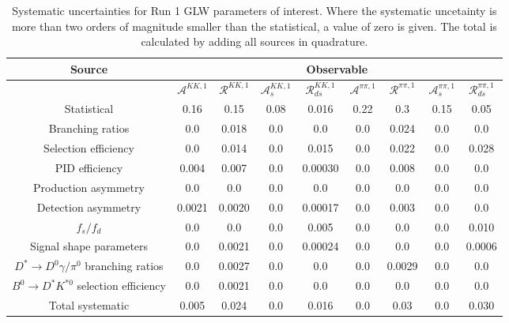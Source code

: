 \begin{sidewaystable}
  \centering
  \begin{tabular}{ccccccccc}
      \toprule
      Source & \multicolumn{8}{c}{Observable} \\
      \midrule
       & $\mathcal{A}^{KK,1}$ & $\mathcal{R}^{KK,1}$ & $\mathcal{A}_s^{KK,1}$ & $\mathcal{R}_{ds}^{KK,1}$ & $\mathcal{A}^{\pi\pi,1}$ & $\mathcal{R}^{\pi\pi,1}$ & $\mathcal{A}_s^{\pi\pi,1}$ & $\mathcal{R}_{ds}^{\pi\pi,1}$ \\
      \midrule
      Statistical & 0.16 & 0.15 & 0.08 & 0.016 & 0.22 & 0.3 & 0.15 & 0.05 \\
      \midrule
      Branching ratios & 0.0  & 0.018 & 0.0  & 0.0  & 0.0  & 0.024 & 0.0  & 0.0  \\
      Selection efficiency & 0.0  & 0.014 & 0.0  & 0.015 & 0.0  & 0.022 & 0.0  & 0.028 \\
      PID efficiency & 0.004 & 0.007 & 0.0  & 0.00030 & 0.0  & 0.008 & 0.0  & 0.0  \\
      Production asymmetry & 0.0  & 0.0  & 0.0  & 0.0  & 0.0  & 0.0  & 0.0  & 0.0  \\
      Detection asymmetry & 0.0021 & 0.0020 & 0.0  & 0.00017 & 0.0  & 0.003 & 0.0  & 0.0  \\
      $f_s/f_d$ & 0.0  & 0.0  & 0.0  & 0.005 & 0.0  & 0.0  & 0.0  & 0.010 \\
      Signal shape parameters & 0.0  & 0.0021 & 0.0  & 0.00024 & 0.0  & 0.0  & 0.0  & 0.0006 \\
      $D^* \to D^0 \gamma/\pi^0$ branching ratios & 0.0  & 0.0027 & 0.0  & 0.0  & 0.0  & 0.0029 & 0.0  & 0.0  \\
      $B^0 \to D^* K^{*0}$ selection efficiency & 0.0  & 0.0021 & 0.0  & 0.0  & 0.0  & 0.0  & 0.0  & 0.0  \\
      \midrule
      Total systematic & 0.005 & 0.024 & 0.0 & 0.016 & 0.0 & 0.03 & 0.0 & 0.030 \\
      \bottomrule
  \end{tabular}
  \caption{Systematic uncertainties for Run 1 GLW parameters of interest. Where the systematic uncetainty is more than two orders of magnitude smaller than the statistical, a value of zero is given. The total is calculated by adding all sources in quadrature.}
\label{tab:KK_run1_systematics}
\end{sidewaystable}
